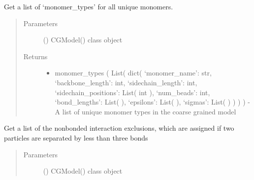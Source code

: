 \documentclass[letterpaper,12pt,english,openany,oneside]{sphinxmanual}
\begin{document}
\begin{fulllineitems}

\begin{fulllineitems}
\label{\detokenize{cg_model:cg_model.cgmodel.CGModel.get_monomer_types}}
Get a list of ‘monomer\_types’ for all unique monomers.
\begin{quote}\begin{description}
\item[{Parameters}] \leavevmode
{} () \textendash{} CGModel() class object

\item[{Returns}] \leavevmode
\begin{itemize}
\item {} 
monomer\_types ( List( dict( ‘monomer\_name’: str, ‘backbone\_length’: int, ‘sidechain\_length’: int, ‘sidechain\_positions’: List( int ), ‘num\_beads’: int, ‘bond\_lengths’: List(  ), ‘epsilons’: List(  ), ‘sigmas’: List(  ) ) ) ) - A list of unique monomer types in the coarse grained model

\end{itemize}


\end{description}\end{quote}

\end{fulllineitems}


\begin{fulllineitems}
\label{\detokenize{cg_model:cg_model.cgmodel.CGModel.get_nonbonded_exclusion_list}}
Get a list of the nonbonded interaction exclusions, which are assigned if two particles are separated by less than three bonds
\begin{quote}\begin{description}
\item[{Parameters}] \leavevmode
{} () \textendash{} CGModel() class object


\end{description}
\end{quote}
\end{fulllineitems}
\end{fulllineitems}
\end{document}
